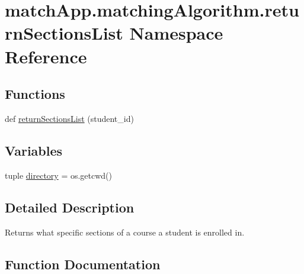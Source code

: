 \hypertarget{namespacematch_app_1_1matching_algorithm_1_1return_sections_list}{}\section{match\+App.\+matching\+Algorithm.\+return\+Sections\+List Namespace Reference}
\label{namespacematch_app_1_1matching_algorithm_1_1return_sections_list}
\subsection*{Functions}
\begin{DoxyCompactItemize}
\item 
def \hyperlink{namespacematch_app_1_1matching_algorithm_1_1return_sections_list_a61d92ecbfb24be77661589d9ad98b172}{return\+Sections\+List} (student\+\_\+id)
\end{DoxyCompactItemize}
\subsection*{Variables}
\begin{DoxyCompactItemize}
\item 
tuple \hyperlink{namespacematch_app_1_1matching_algorithm_1_1return_sections_list_afc15733dc8e15c6878954647aa9c4428}{directory} = os.\+getcwd()
\end{DoxyCompactItemize}


\subsection{Detailed Description}
\begin{DoxyVerb}Returns what specific sections of a course a student is enrolled in. \end{DoxyVerb}
 

\subsection{Function Documentation}
\hypertarget{namespacematch_app_1_1matching_algorithm_1_1return_sections_list_a61d92ecbfb24be77661589d9ad98b172}{}
